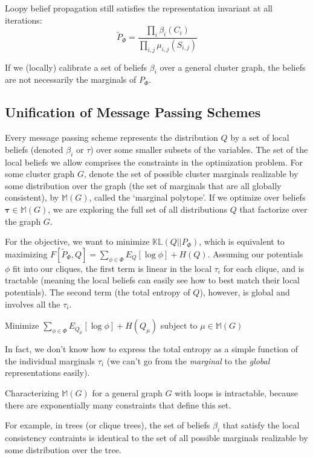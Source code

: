 \documentclass[11pt]{article}
\newcommand{\KL}[2]{\mathbb{KL}\left(#1||#2\right)}
\newcommand{\mb}[1]{\mathbf{#1}}
\begin{document}
Loopy belief propagation still satisfies the representation invariant at all iterations:
\[ \tilde{P}_\Phi = \frac{\prod_i \beta_i(C_i)}{\prod_{i,j} \mu_{i,j}(S_{i,j})} \]

If we (locally) calibrate a set of beliefs $\beta_i$ over a general cluster graph, the beliefs are not necessarily the marginals of $P_\Phi$.

\subsection*{Unification of Message Passing Schemes}
Every message passing scheme represents the distribution $Q$ by a set of local beliefs (denoted $\beta_i$ or $\tau$) over some smaller subsets of the variables. The set of the local beliefs we allow comprises the constraints in the optimization problem. For some cluster graph $G$, denote the set of possible cluster marginals realizable by some distribution over the graph (the set of marginals that are all globally consistent), by $\mathbb{M}(G)$, called the `marginal polytope'. If we optimize over beliefs $\mb{\tau} \in \mathbb{M}(G)$, we are exploring the full set of all distributions $Q$ that factorize over the graph $G$. 

For the objective, we want to minimize $\KL{Q}{P_\Phi}$, which is equivalent to maximizing $F[\tilde{P}_\Phi,Q] =  \sum_{\phi \in \Phi} E_Q[\log \phi] + H(Q)$. Assuming our potentials $\phi$ fit into our cliques, the first term is linear in the local $\tau_i$ for each clique, and is tractable (meaning the local beliefs can easily see how to best match their local potentials). The second term (the total entropy of $Q$), however, is global and involves all the $\tau_i$.

Minimize $\sum_{\phi \in \Phi} E_{Q_\mu}[\log \phi] + H(Q_{\mu})$ subject to $\mu \in \mathbb{M}(G)$



In fact, we don't know how to express the total entropy as a simple function of the individual marginals $\tau_i$ (we can't go from the \emph{marginal} to the \emph{global} representations easily).

Characterizing $\mathbb{M}(G)$ for a general graph $G$ with loops is intractable, because there are exponentially many constraints that define this set.

For example, in trees (or clique trees), the set of beliefs $\beta_i$ that satisfy the local consistency contraints is identical to the set of all possible marginals realizable by some distribution over the tree.
\end{document}
